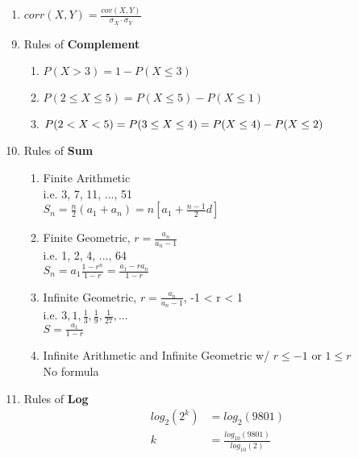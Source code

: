 \documentclass{article}
\begin{document}
\begin{small}
\begin{multicols}{2}
\begin{enumerate}
  \begin{enumerate}
  \item $corr(X, Y) = \frac{cov(X, Y)}{\sigma_X \cdot \sigma_Y}$
  \end{enumerate}

\end{enumerate}

\columnbreak
\begin{enumerate}
  \setcounter{enumi}{8}
  \item Rules of \textbf{Complement}
  \begin{enumerate}
  \item $P(X > 3) = 1 - P(X \le 3)$
  \item $P(2 \le X \le 5) = P(X \le 5) - P(X \le 1)$
  \item$P(2 < X < 5) \\= P(3 \le X \le 4) = P(X \le 4) - P(X \le 2)$
  \end{enumerate}
  
  \item Rules of \textbf{Sum}
  \begin{enumerate}
  \item Finite Arithmetic \\
        i.e. 3, 7, 11, ..., 51 \\
        $S_n = \frac{n}{2}(a_1 + a_n) = n[a_1 + \frac{n-1}{2}d]$
  \item Finite Geometric, $r = \frac{a_n}{a_n - 1}$ \\
        i.e. 1, 2, 4, ..., 64 \\
        $S_n = a_1 \frac{1 - r^n}{1 - r} = \frac{a_1 - ra_n}{1 - r}$
  \item Infinite Geometric, $r = \frac{a_n}{a_n - 1}$, -1 < r < 1\\
        i.e. $3, 1, \frac{1}{3}, \frac{1}{9}, \frac{1}{27}, ...$ \\
        $S = \frac{a_1}{1 - r}$
  \item Infinite Arithmetic and Infinite Geometric w/ $r \le -1$ or $1 \le r$ \\
        No formula
  \end{enumerate}
  
  \item Rules of \textbf{Log} 
  \begin{align*}
  log_2(2^k) & = log_2(9801) \\
          k  & = \frac{log_{10}(9801)}{log_{10}(2)}
  \end{align*}
  

\end{enumerate}
\end{multicols}
\end{small}
\end{document}
